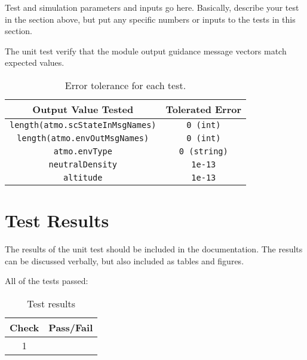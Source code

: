 Test and simulation parameters and inputs go here. Basically, describe your test in the section above, but put any specific numbers or inputs to the tests in this section.

The unit test verify that the module output guidance message vectors match expected values.
\begin{table}[htbp]
	\caption{Error tolerance for each test.}
	\label{tab:errortol}
	\centering \fontsize{10}{10}\selectfont
	\begin{tabular}{ c | c } %
		\hline\hline
		\textbf{Output Value Tested}  & \textbf{Tolerated Error}  \\ 
		\hline
		{\tt length(atmo.scStateInMsgNames)}        & {\tt 0 (int)}   \\
		\hline 
		{\tt length(atmo.envOutMsgNames)}        & {\tt 0 (int)}   \\ 
		\hline
		{\tt atmo.envType}        & {\tt 0 (string)}   \\ 
		\hline
		{\tt neutralDensity}        & {\tt 1e-13}   \\ 
		\hline
		{\tt altitude} & {\tt 1e-13}\\
		\hline\hline
	\end{tabular}
\end{table}




\section{Test Results}
The results of the unit test should be included in the documentation.  The results can be discussed verbally, but also included as tables and figures.  

All of the tests passed:
\begin{table}[H]
	\caption{Test results}
	\label{tab:results}
	\centering \fontsize{10}{10}\selectfont
	\begin{tabular}{c | c  } %
		\hline\hline
		\textbf{Check} 						  		&\textbf{Pass/Fail} \\ 
		\hline
	   1	   			&  \\ 
	   \hline\hline
	\end{tabular}
\end{table}




